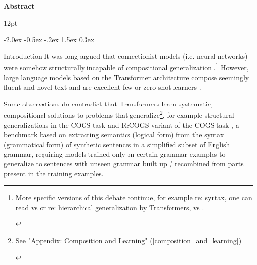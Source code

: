 \documentclass[11pt]{article}
\makeatletter
\renewcommand\section{\@startsection{section}{1}{\z@}%
                                  {-2.0ex \@plus -0.5ex \@minus -.2ex}%
                                  {1.5ex \@plus 0.3ex}%
                                  {\large\bfseries\raggedright}}
\renewenvironment{abstract}{\begin{center}\large\textbf{Abstract}\end{center}\begin{list}{}{\setlength{\rightmargin}{0.55cm}\setlength{\leftmargin}{0.55cm}}\item[]\ignorespaces\@setsize\normalsize{12pt}\xpt\@xpt}{\unskip\end{list}}
\makeatother
\begin{document}
\begin{abstract}
\end{abstract}

\section{Introduction}
It was long argued that connectionist models (i.e. neural networks) were somehow structurally incapable of compositional generalization \citep{FodorPylyshyn1988}.\footnote{\begin{footnotesize}More specific versions of this debate continue, for example re: syntax, one can read \citep{vanschijndel2019quantitydoesntbuyquality} vs \citep{goldberg2019assessingbertssyntacticabilities} or re: hierarchical generalization by Transformers, \citep{petty2021transformersgeneralizelinearly} vs \citep{murty2023grokkinghierarchicalstructurevanilla}.
\end{footnotesize}
} 
However, large language models based on the Transformer architecture \citep{vaswani2017attention} compose seemingly fluent and novel text and are excellent few or zero shot learners \citep{Brown2020}.

Some observations do contradict that Transformers learn systematic, compositional solutions to problems that generalize\footnote{\begin{footnotesize}See "Appendix: Composition and Learning" (\ref{composition_and_learning})\end{footnotesize}}, for example structural generalizations
in the COGS task and ReCOGS\citep{Wu2023} variant of the COGS task \citep{KimLinzen2020}
, a benchmark based on extracting semantics (logical form) from the syntax (grammatical form) of synthetic sentences in a simplified subset of English grammar, requiring models trained only on certain grammar examples to generalize to sentences with unseen grammar built up / recombined from parts present in the training examples.
\end{document}
